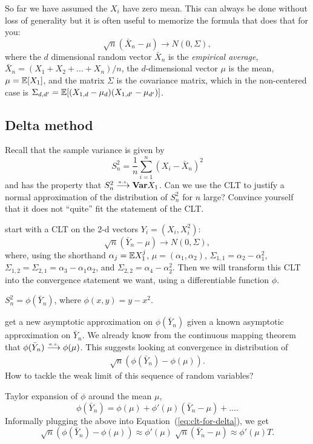\documentclass{article}
\begin{document}
So far we have assumed the $X_i$ have zero mean. This can always be done without loss of generality but it is often useful to memorize the formula that does that for you:
\[ \sqrt{n}(\bar X_n - \mu) \to N(0, \Sigma), \]
where the $d$ dimensional random vector $\bar X_n$ is the \emph{empirical average}, $\bar X_n = (X_1 + X_2 + \dots + X_n) /n$, the $d$-dimensional vector $\mu$ is the mean, $\mu = {\mathbb E}[X_1]$, and the matrix $\Sigma$ is the covariance matrix, which in the non-centered case is $\Sigma_{d,d'} = {\mathbb E}[ (X_{1,d} - \mu_d) (X_{1,d'} - \mu_{d'}) ]$.


\subsection{Delta method}\label{sec:delta-method}

 Recall that the sample variance is given by
\[ S_n^2 = \frac{1}{n} \sum_{i=1}^n (X_i - \bar X_n)^2 \]
and has the property that $S_n^2 \stackrel{\scriptscriptstyle a.s.}{\longrightarrow} {\text {\bf Var}} X_1$. Can we use the CLT to justify a normal approximation of the distribution of $S_n^2$ for $n$ large? Convince yourself that it does not ``quite'' fit the statement of the CLT.

 start with a CLT on the 2-d vectors $Y_i = (X_i, X_i^2)$:
\[ \sqrt{n}(\bar Y_n - \mu) \to N(0, \Sigma), \]
where, using the shorthand $\alpha_j = {\mathbb E} X_1^j$, $\mu = (\alpha_1, \alpha_2)$, $\Sigma_{1,1} = \alpha_2 - \alpha_1^2$, $\Sigma_{1,2} = \Sigma_{2,1} = \alpha_3 - \alpha_1 \alpha_2$, and  $\Sigma_{2,2} = \alpha_4 - \alpha_2^2$. Then we will transform this CLT into the convergence statement we want, using a differentiable function $\phi$. 

 $S_n^2 = \phi(\bar Y_n)$, where $\phi(x, y) = y - x^2$. 

 get a new asymptotic approximation on $\phi(\bar Y_n)$ given a known asymptotic approximation on $\bar Y_n$. We already know from the continuous mapping theorem that $\phi(\bar Y_n) \stackrel{\scriptscriptstyle a.s.}{\longrightarrow} \phi(\mu)$. This suggests looking at convergence in distribution of 
\begin{align}\label{eq:clt-for-delta}
\sqrt{n}(\phi(\bar Y_n) - \phi(\mu)).
\end{align}
How to tackle the weak limit of this sequence of random variables?

 Taylor expansion of $\phi$ around the mean $\mu$, 
\[\phi(\bar Y_n) = \phi(\mu) + \phi'(\mu)(\bar Y_n - \mu) + \dots.\]
Informally plugging the above into Equation~(\ref{eq:clt-for-delta}), we get
\[ \sqrt{n}(\phi(\bar Y_n) - \phi(\mu)) \approx \phi'(\mu) \; \sqrt{n} (\bar Y_n - \mu) \approx \phi'(\mu) T. \]
\end{document}

